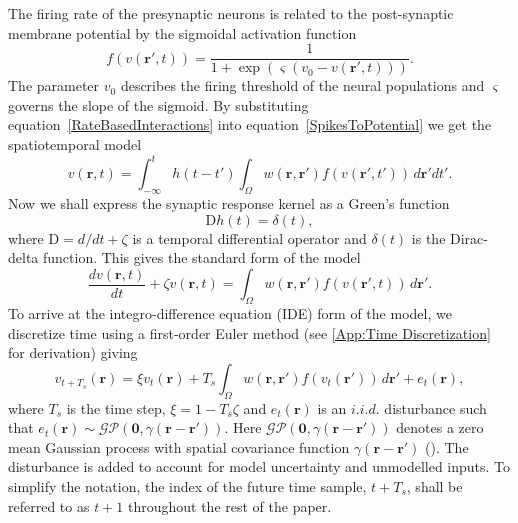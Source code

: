 \documentclass[5p,authoryear]{elsarticle}
\begin{document}
The firing rate of the presynaptic neurons is related to the post-synaptic membrane potential by the sigmoidal activation function 
\begin{equation}
	\label{ActivationFunction} f\left( v\left( \mathbf{r}', t \right) \right) = \frac{1}{1 + \exp \left( \varsigma \left( v_0 - v\left(\mathbf{r}',t\right) \right) \right)}. 
\end{equation}
The parameter $v_0$ describes the firing threshold of the neural populations and $\varsigma$ governs the slope of the sigmoid. By substituting equation~\ref{RateBasedInteractions} into equation~\ref{SpikesToPotential} we get the spatiotemporal model 
\begin{equation}
	\label{FullDoubleIntModel} v\left(\mathbf{r},t\right) =
	\int_{-\infty}^t 
	h\left(t - t'\right) \int_\Omega
	w\left(\mathbf{r},\mathbf{r}'\right) 
	f\left( v\left( \mathbf{r}',t' \right)\right)
	\, d\mathbf{r}'dt'.
\end{equation}
Now we shall express the synaptic response kernel as a Green's function 
\begin{equation}
	\label{GreensFuncDef} \textrm{D}h\left( t \right) = \delta \left( t \right), 
\end{equation}
where $\textrm{D}=d/dt + \zeta$ is a temporal differential operator and $\delta(t)$ is the Dirac-delta function. This gives the standard form of the model
\begin{equation}
	\label{FinalFormContinuous} 
	\frac{dv\left( \mathbf{r},t \right)}{dt} + \zeta v\left( \mathbf{r},t \right) = \int_\Omega {w\left( \mathbf{r},\mathbf{r}' \right)f\left( {v\left( \mathbf{r}',t \right)} \right)\, d\mathbf{r}'}. 
\end{equation}
To arrive at the integro-difference equation (IDE) form of the model, we discretize time using a first-order Euler method (see \ref{App:Time Discretization} for derivation) giving 
\begin{equation}
	\label{DiscreteTimeModel} 
	v_{t+T_s}\left(\mathbf{r}\right) = 
	\xi v_t\left(\mathbf{r}\right) + 
	T_s \int_\Omega { 
	    w\left(\mathbf{r},\mathbf{r}'\right)
	    f\left(v_t\left(\mathbf{r}'\right)\right) 
	\, d\mathbf{r}'} 
	+ e_t\left(\mathbf{r}\right), 
\end{equation}
where $T_s$ is the time step, $\xi = 1-T_s\zeta $ and $e_t(\mathbf{r})$ is an $i.i.d.$ disturbance such that $e_t(\mathbf{r})\sim\mathcal{GP}(\mathbf 0,\gamma(\mathbf{r}-\mathbf{r}'))$. Here $\mathcal{GP}(\mathbf 0,\gamma(\mathbf{r}-\mathbf{r}'))$ denotes a zero mean Gaussian process with spatial covariance function $\gamma(\mathbf{r}-\mathbf{r}')$ (\cite{Rasmussen2005}). The disturbance is added to account for model uncertainty and unmodelled inputs. To simplify the notation, the index of the future time sample, $t+T_s$, shall be referred to as $t+1$ throughout the rest of the paper. 
\end{document}
